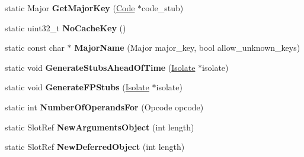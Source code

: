 \begin{DoxyCompactItemize}
\item 
\hypertarget{classv8_1_1internal_1_1_b_a_s_e___e_m_b_e_d_d_e_d_a75976d5ec22cbd48d646ba4826d24729}{}static Major {\bfseries Get\+Major\+Key} (\hyperlink{classv8_1_1internal_1_1_code}{Code} $\ast$code\+\_\+stub)\label{classv8_1_1internal_1_1_b_a_s_e___e_m_b_e_d_d_e_d_a75976d5ec22cbd48d646ba4826d24729}

\item 
\hypertarget{classv8_1_1internal_1_1_b_a_s_e___e_m_b_e_d_d_e_d_a09fabf1be6b09faace6f76d183e371c2}{}static uint32\+\_\+t {\bfseries No\+Cache\+Key} ()\label{classv8_1_1internal_1_1_b_a_s_e___e_m_b_e_d_d_e_d_a09fabf1be6b09faace6f76d183e371c2}

\item 
\hypertarget{classv8_1_1internal_1_1_b_a_s_e___e_m_b_e_d_d_e_d_a78549822620b4917e8ab72d85d5469c9}{}static const char $\ast$ {\bfseries Major\+Name} (Major major\+\_\+key, bool allow\+\_\+unknown\+\_\+keys)\label{classv8_1_1internal_1_1_b_a_s_e___e_m_b_e_d_d_e_d_a78549822620b4917e8ab72d85d5469c9}

\item 
\hypertarget{classv8_1_1internal_1_1_b_a_s_e___e_m_b_e_d_d_e_d_a4937d19f03912fcf8ef8d76767ca92cb}{}static void {\bfseries Generate\+Stubs\+Ahead\+Of\+Time} (\hyperlink{classv8_1_1internal_1_1_isolate}{Isolate} $\ast$isolate)\label{classv8_1_1internal_1_1_b_a_s_e___e_m_b_e_d_d_e_d_a4937d19f03912fcf8ef8d76767ca92cb}

\item 
\hypertarget{classv8_1_1internal_1_1_b_a_s_e___e_m_b_e_d_d_e_d_a441a795b40103a14deea7464aeb148e3}{}static void {\bfseries Generate\+F\+P\+Stubs} (\hyperlink{classv8_1_1internal_1_1_isolate}{Isolate} $\ast$isolate)\label{classv8_1_1internal_1_1_b_a_s_e___e_m_b_e_d_d_e_d_a441a795b40103a14deea7464aeb148e3}

\item 
\hypertarget{classv8_1_1internal_1_1_b_a_s_e___e_m_b_e_d_d_e_d_aa7e7d11044a8614b1a2abee0e6904e26}{}static int {\bfseries Number\+Of\+Operands\+For} (Opcode opcode)\label{classv8_1_1internal_1_1_b_a_s_e___e_m_b_e_d_d_e_d_aa7e7d11044a8614b1a2abee0e6904e26}

\item 
\hypertarget{classv8_1_1internal_1_1_b_a_s_e___e_m_b_e_d_d_e_d_ab08e5448d98d58ed280e4c6ead980786}{}static Slot\+Ref {\bfseries New\+Arguments\+Object} (int length)\label{classv8_1_1internal_1_1_b_a_s_e___e_m_b_e_d_d_e_d_ab08e5448d98d58ed280e4c6ead980786}

\item 
\hypertarget{classv8_1_1internal_1_1_b_a_s_e___e_m_b_e_d_d_e_d_a9dc5f11ee8fdc2dad3ef9c262ff5f9dc}{}static Slot\+Ref {\bfseries New\+Deferred\+Object} (int length)\label{classv8_1_1internal_1_1_b_a_s_e___e_m_b_e_d_d_e_d_a9dc5f11ee8fdc2dad3ef9c262ff5f9dc}


\end{DoxyCompactItemize}
